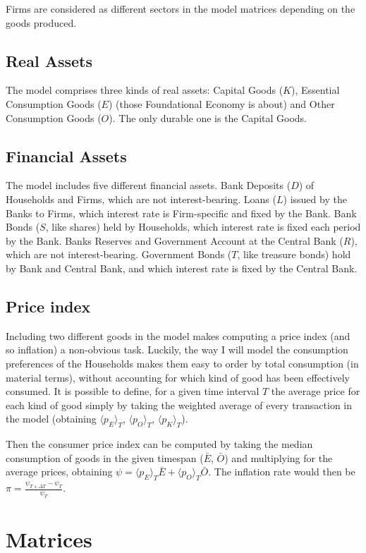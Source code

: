 \documentclass[a4paper, headings=standardclasses]{scrartcl}
\begin{document}
Firms are considered as different sectors in the model matrices depending on the goods produced.

\subsection{Real Assets}
The model comprises three kinds of real assets: Capital Goods ($K$), Essential Consumption Goods ($E$) (those Foundational Economy is about) and Other Consumption Goods ($O$).
The only durable one is the Capital Goods.

\subsection{Financial Assets}
The model includes five different financial assets.
Bank Deposits ($D$) of Households and Firms, which are not interest-bearing.
Loans ($L$) issued by the Banks to Firms, which interest rate is Firm-specific and fixed by the Bank.
Bank Bonds ($S$, like shares) held by Households, which interest rate is fixed each period by the Bank.
Banks Reserves and Government Account at the Central Bank ($R$), which are not interest-bearing.
Government Bonds ($T$, like treasure bonds) hold by Bank and Central Bank, and which interest rate is fixed by the Central Bank.

\subsection{Price index}
Including two different goods in the model makes computing a price index (and so inflation) a non-obvious task.
Luckily, the way I will model the consumption preferences of the Households makes them easy to order by total consumption (in material terms), without accounting for which kind of good has been effectively consumed.
It is possible to define, for a given time interval $T$ the average price for each kind of good simply by taking the weighted average of every transaction in the model (obtaining $\langle p_E \rangle_T$, $\langle p_O \rangle_T$, $\langle p_K \rangle_T$).

Then the consumer price index can be computed by taking the median consumption of goods in the given timespan ($\bar{E}$, $\bar{O}$) and multiplying for the average prices, obtaining $\psi = \langle p_E \rangle_T \bar{E} + \langle p_O \rangle_T \bar{O}$. The inflation rate would then be $\pi = \frac{\psi_{T + \Delta T} - \psi_T}{\psi_T}$.


\section{Matrices}
\end{document}
